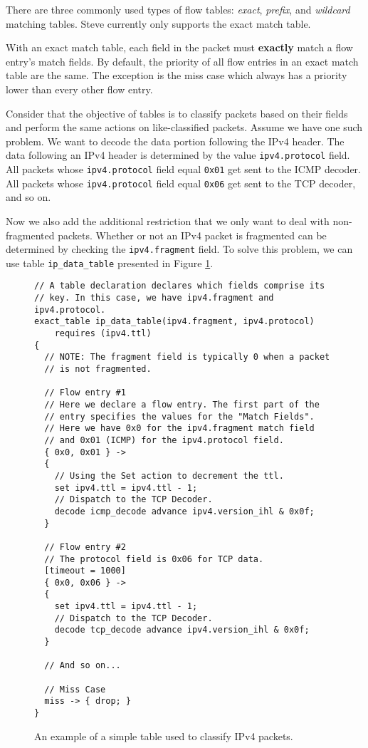 There are three commonly used types of flow tables: \textit{exact}, \textit{prefix}, and \textit{wildcard} matching tables. Steve currently only supports the exact match table. 

With an exact match table, each field in the packet must \textbf{exactly} match a flow entry's match fields. By default, the priority of all flow entries in an exact match table are the same. The exception is the miss case which always has a priority lower than every other flow entry.

Consider that the objective of tables is to classify packets based on their fields and perform the same actions on like-classified packets. Assume we have one such problem. We want to decode the data portion following the IPv4 header. The data following an IPv4 header is determined by the value \texttt{ipv4.protocol} field. All packets whose \texttt{ipv4.protocol} field equal \texttt{0x01} get sent to the ICMP decoder. All packets whose \texttt{ipv4.protocol} field equal \texttt{0x06} get sent to the TCP decoder, and so on.

Now we also add the additional restriction that we only want to deal with non-fragmented packets. Whether or not an IPv4 packet is fragmented can be determined by checking the \texttt{ipv4.fragment} field. To solve this problem, we can use table \texttt{ip\_data\_table} presented in Figure \ref{fg:ip_table_ex}.

\begin{figure}
\begin{lstlisting}
// A table declaration declares which fields comprise its
// key. In this case, we have ipv4.fragment and ipv4.protocol.
exact_table ip_data_table(ipv4.fragment, ipv4.protocol)
	requires (ipv4.ttl)
{
  // NOTE: The fragment field is typically 0 when a packet
  // is not fragmented.
  
  // Flow entry #1 
  // Here we declare a flow entry. The first part of the
  // entry specifies the values for the "Match Fields".
  // Here we have 0x0 for the ipv4.fragment match field
  // and 0x01 (ICMP) for the ipv4.protocol field.
  { 0x0, 0x01 } ->
  {
    // Using the Set action to decrement the ttl.
  	set ipv4.ttl = ipv4.ttl - 1;
  	// Dispatch to the TCP Decoder.
  	decode icmp_decode advance ipv4.version_ihl & 0x0f;
  } 
  
  // Flow entry #2
  // The protocol field is 0x06 for TCP data.
  [timeout = 1000]
  { 0x0, 0x06 } ->
  {
  	set ipv4.ttl = ipv4.ttl - 1;
  	// Dispatch to the TCP Decoder.
  	decode tcp_decode advance ipv4.version_ihl & 0x0f;
  } 
    
  // And so on...
  
  // Miss Case
  miss -> { drop; }
}
\end{lstlisting}
\caption{An example of a simple table used to classify IPv4 packets.}
\label{fg:ip_table_ex}
\end{figure}

